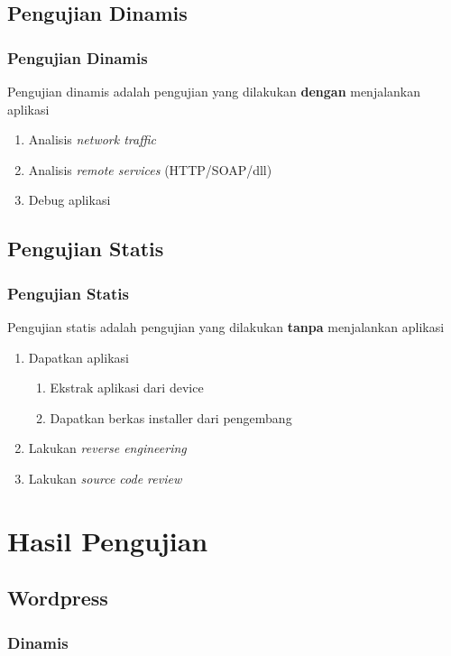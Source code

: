 \documentclass[xcolor=pdftex,table,10pt]{beamer}
\begin{document}
\subsection{Pengujian Dinamis}
\begin{frame}
	\frametitle{Pengujian Dinamis}
	Pengujian dinamis adalah pengujian yang dilakukan \textbf{dengan} menjalankan aplikasi 
	\begin{enumerate}
		\item Analisis \textit{network traffic}
		\item Analisis \textit{remote services} (HTTP/SOAP/dll)
		\item Debug aplikasi
	\end{enumerate}
\end{frame}

\subsection{Pengujian Statis}
\begin{frame}
	\frametitle{Pengujian Statis}
	Pengujian statis adalah pengujian yang dilakukan \textbf{tanpa} menjalankan aplikasi 	
	\begin{enumerate}
		\item Dapatkan aplikasi
		\begin{enumerate}
			\item Ekstrak aplikasi dari device
			\item Dapatkan berkas installer dari pengembang
		\end{enumerate}				
		\item Lakukan \textit{reverse engineering}
		\item Lakukan \textit{source code review}
	\end{enumerate}
\end{frame}

\section{Hasil Pengujian}

\subsection{Wordpress}
\subsubsection{Dinamis}
\end{document}
